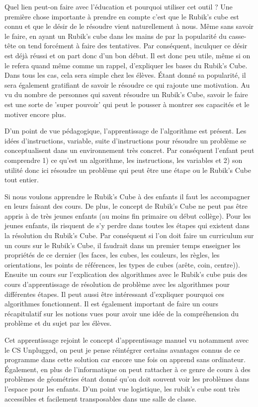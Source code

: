 \newpage

Quel lien peut-on faire avec l'éducation et pourquoi utiliser cet outil ? Une première chose importante à prendre en compte c'est que le Rubik's cube est connu et que le désir de le résoudre vient naturellement à nous. Même sans savoir le faire, en ayant un Rubik's cube dans les mains de par la popularité du casse-tête on tend forcément à faire des tentatives. Par conséquent, inculquer ce désir est déjà réussi et on part donc d'un bon début. Il est donc peu utile, même si on le refera quand même comme un rappel, d'expliquer les bases du Rubik's Cube. Dans tous les cas, cela sera simple chez les élèves. Étant donné sa popularité, il sera également gratifiant de savoir le résoudre ce qui rajoute une motivation. Au vu du nombre de personnes qui savent résoudre un Rubik's Cube, savoir le faire est une sorte de 'super pouvoir' qui peut le pousser à montrer ses capacités et le motiver encore plus.

D'un point de vue pédagogique, l'apprentissage de l'algorithme est présent. Les idées d'instructions, variable, suite d'instructions pour résoudre un problème se conceptualisent dans un environnement très concret. Par conséquent l'enfant peut comprendre 1) ce qu'est un algorithme, les instructions, les variables et 2) son utilité donc ici résoudre un problème qui peut être une étape ou le Rubik's Cube tout entier.

Si nous voulons apprendre le Rubik's Cube à des enfants il faut les accompagner en leurs faisant des cours. De plus, le concept de Rubik's Cube ne peut pas être appris à de très jeunes enfants (au moins fin primaire ou début collège). Pour les jeunes enfants, ils risquent de s'y perdre dans toutes les étapes qui existent dans la résolution du Rubik's Cube. Par conséquent si l'on doit faire un curriculum sur un cours sur le Rubik's Cube, il faudrait dans un premier temps enseigner les propriétés de ce dernier (les faces, les cubes, les couleurs, les règles, les orientations, les points de références, les types de cubes (arête, coin, centre)). Ensuite un cours sur l'explication des algorithmes avec le Rubik's cube puis des cours d'apprentissage de résolution de problème avec les algorithmes pour différentes étapes. Il peut aussi être intéressant d'expliquer pourquoi ces algorithmes fonctionnent. Il est également important de faire un cours récapitulatif sur les notions vues pour avoir une idée de la compréhension du problème et du sujet par les élèves. 

Cet apprentissage rejoint le concept d'apprentissage manuel vu notamment avec le CS Unplugged, on peut je pense réintégrer certains avantages connus de ce programme dans cette solution car encore une fois on apprend sans ordinateur. Également, en plus de l'informatique on peut rattacher à ce genre de cours à des problèmes de géométries étant donné qu'on doit souvent voir les problèmes dans l'espace pour les enfants. D'un point vue logistique, les rubik's cube sont très accessibles et facilement transposables dans une salle de classe.

